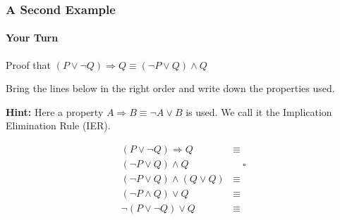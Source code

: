 \documentclass{beamer}
\theoremstyle{remark}
\begin{document}

\begin{frame}
	\frametitle{A Second Example}
	\framesubtitle{Your Turn}
	Proof that $(P \lor \lnot Q) \Rightarrow Q \equiv (\lnot P \lor Q) \land Q$

	Bring the lines below in the right order and write down the properties used.

	{\bf Hint:} Here a property $A \Rightarrow B \equiv \lnot A \lor B$ is used. We call it the Implication Elimination Rule (IER).

	\begin{align}
		(P \lor \lnot Q) \Rightarrow Q & \equiv \\
		(\lnot P \lor Q) \land Q & \hspace{1em}\square \\
		(\lnot P \lor Q) \land (Q \lor Q) & \equiv \\
		(\lnot P \land Q) \lor Q & \equiv \\
		\lnot(P \lor \lnot Q) \lor Q & \equiv
	\end{align}
\end{frame}
\end{document}
